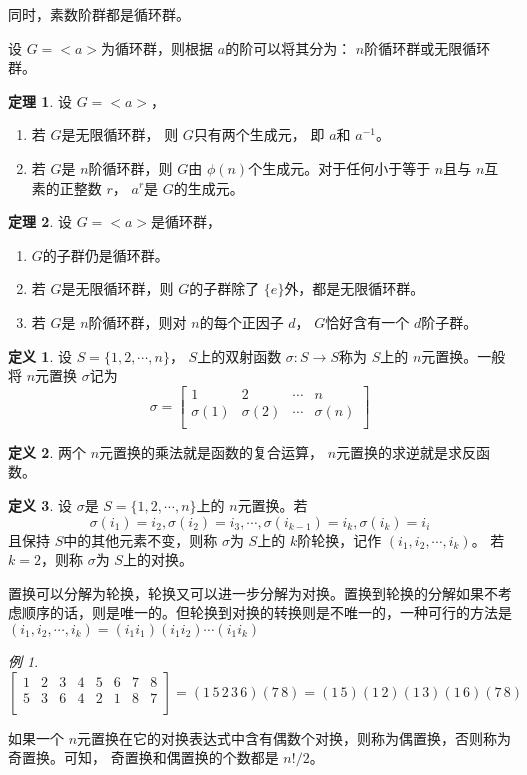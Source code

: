 \documentclass[a4paper,11pt]{article}%
\theoremstyle{remark}
\theoremstyle{remark}
\newtheorem*{example}{例}
\theoremstyle{definition}
\newtheorem{theorem}{定理}[section]
\theoremstyle{definition}
\newtheorem*{definition}{定义}
\theoremstyle{plain}
\begin{document}
同时，素数阶群都是循环群。

设 $G=<a>$为循环群，则根据 $a$的阶可以将其分为： $n$阶循环群或无限循环群。
\begin{theorem}
    设 $G=<a>$，
    \begin{enumerate}
        \item 若 $G$是无限循环群， 则 $G$只有两个生成元， 即 $a$和 $a^{-1}$。
        \item 若 $G$是 $n$阶循环群，则 $G$由 $\phi(n)$个生成元。对于任何小于等于 $n$且与 $n$互素的正整数 $r$， $a^r$是 $G$的生成元。   
    \end{enumerate}
\end{theorem}
\begin{theorem}
    设 $G=<a>$是循环群， 
    \begin{enumerate}
        \item $G$的子群仍是循环群。
        \item 若 $G$是无限循环群，则 $G$的子群除了 $\{e\}$外，都是无限循环群。
        \item 若 $G$是 $n$阶循环群，则对 $n$的每个正因子 $d$， $G$恰好含有一个 $d$阶子群。
    \end{enumerate}
\end{theorem}
\begin{definition}
    设 $S=\{1,2,\cdots,n\}$， $S$上的双射函数 $\sigma:S\rightarrow S$称为 $S$上的 $n$元置换。一般将 $n$元置换 $\sigma$记为 
    \[\sigma=\begin{bmatrix}
       1&2&\cdots&n\\
       \sigma(1)&\sigma(2)&\cdots&\sigma(n)\\
    \end{bmatrix}\]
\end{definition}
\begin{definition}
    两个 $n$元置换的乘法就是函数的复合运算， $n$元置换的求逆就是求反函数。
\end{definition}
\begin{definition}
    设 $\sigma$是 $S=\{1,2,\cdots,n\}$上的 $n$元置换。若 
    \[\sigma(i_1)=i_2,\sigma(i_2)=i_3,\cdots,\sigma(i_{k-1})=i_k,\sigma(i_k)=i_i\]
    且保持 $S$中的其他元素不变，则称 $\sigma$为 $S$上的 $k$阶轮换，记作 $(i_1,i_2,\cdots,i_k)$。 若 $k=2$，则称 $\sigma$为 $S$上的对换。
\end{definition}
置换可以分解为轮换，轮换又可以进一步分解为对换。置换到轮换的分解如果不考虑顺序的话，则是唯一的。但轮换到对换的转换则是不唯一的，一种可行的方法是 $(i_1,i_2,\cdots,i_k)=(i_1i_1)(i_1i_2)\cdots(i_1i_k)$
\begin{example}
    \[
     \begin{bmatrix}
        1&2&3&4&5&6&7&8\\
        5&3&6&4&2&1&8&7\\
     \end{bmatrix}
     =(1\,5\,2\,3\,6)(7\,8)=(1\,5)(1\,2)(1\,3)(1\,6)(7\,8)
    \]
\end{example}
如果一个 $n$元置换在它的对换表达式中含有偶数个对换，则称为偶置换，否则称为奇置换。可知， 奇置换和偶置换的个数都是 $n!/2$。
\end{document}
